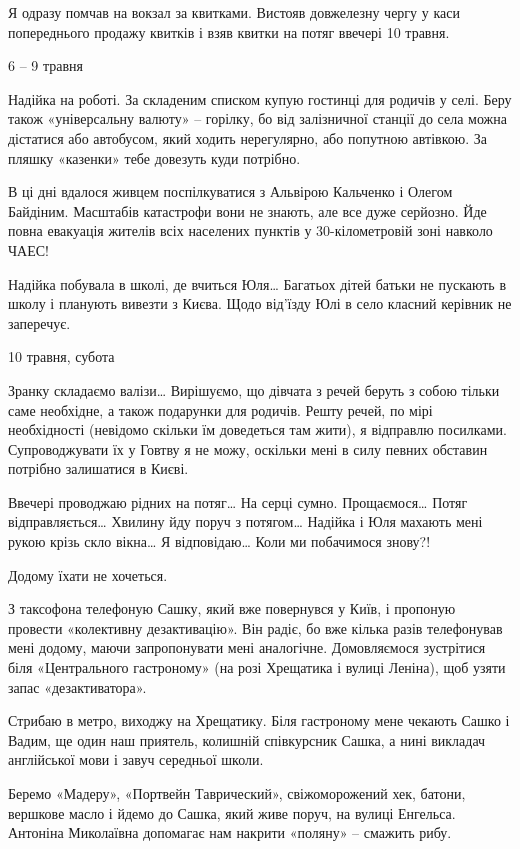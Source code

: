 Я одразу помчав на вокзал за квитками. Вистояв довжелезну чергу у каси
попереднього продажу квитків і взяв квитки на потяг ввечері 10 травня. 

6 – 9 травня

Надійка на роботі. За складеним списком купую гостинці для родичів у селі. Беру
також «універсальну валюту» – горілку, бо від залізничної станції до села можна
дістатися або автобусом, який ходить нерегулярно, або попутною автівкою. За
пляшку «казенки» тебе довезуть куди потрібно. 

В ці дні вдалося живцем поспілкуватися з Альвірою Кальченко і Олегом Байдіним.
Масштабів катастрофи вони не знають, але все дуже серйозно. Йде повна евакуація
жителів всіх населених пунктів у 30-кілометровій зоні навколо ЧАЕС!

Надійка побувала в школі, де вчиться Юля… Багатьох дітей батьки не пускають в
школу і планують вивезти з Києва. Щодо від’їзду Юлі в село класний керівник не
заперечує.

10 травня, субота

Зранку складаємо валізи… Вирішуємо, що дівчата з речей беруть з собою тільки
саме необхідне, а також подарунки для родичів. Решту речей, по мірі
необхідності (невідомо скільки їм доведеться там жити), я відправлю посилками.
Супроводжувати їх у Говтву я не можу, оскільки мені в силу певних обставин
потрібно залишатися в Києві.

Ввечері проводжаю рідних на потяг… На серці сумно. Прощаємося… Потяг
відправляється… Хвилину йду поруч з потягом… Надійка і Юля махають мені рукою
крізь скло вікна… Я відповідаю… Коли ми побачимося знову?!

Додому їхати не хочеться.

З таксофона телефоную Сашку, який вже повернувся у Київ, і пропоную провести
«колективну дезактивацію». Він радіє, бо вже кілька разів телефонував мені
додому, маючи запропонувати мені аналогічне. Домовляємося зустрітися біля
«Центрального гастроному» (на розі Хрещатика і вулиці Леніна), щоб узяти запас
«дезактиватора».

Стрибаю в метро, виходжу на Хрещатику. Біля гастроному мене чекають Сашко і
Вадим, ще один наш приятель, колишній співкурсник Сашка, а нині викладач
англійської мови і завуч середньої школи. 

Беремо «Мадеру», «Портвейн Таврический», свіжоморожений хек, батони, вершкове
масло і йдемо до Сашка, який живе поруч, на вулиці Енгельса. Антоніна
Миколаївна допомагає нам накрити «поляну» – смажить рибу. 

